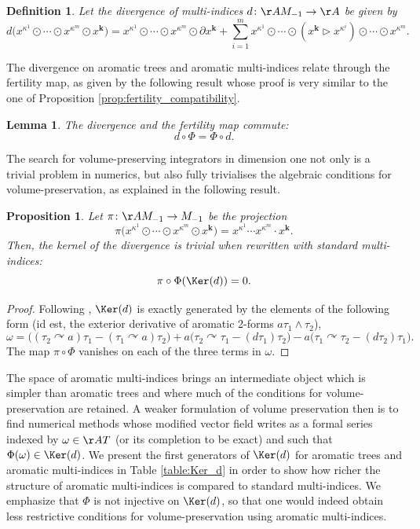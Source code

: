\documentclass[a4paper,11pt]{article}
\newtheorem{definition}[theorem]{Definition}
\newtheorem{proposition}[theorem]{Proposition}
\newtheorem{lemma}[theorem]{Lemma}
\begin{document}
\begin{definition}
Let the divergence of multi-indices $d\colon \AA M_{-1}\rightarrow \AA$ be given by
\[
d\big(x^{\kappa^1}\odot\cdots \odot x^{\kappa^m}\odot x^{\mathbf k}\big)
=x^{\kappa^1}\odot\cdots \odot x^{\kappa^m}\odot \partial x^{\mathbf k}
+\sum_{i=1}^m x^{\kappa^1}\odot\cdots \odot (x^{\mathbf k}\rhd x^{\kappa^i}) \odot\cdots \odot x^{\kappa^m}.
\]
\end{definition}

The divergence on aromatic trees and aromatic multi-indices relate through the fertility map, as given by the following result whose proof is very similar to the one of Proposition \ref{prop:fertility_compatibility}.
\begin{lemma}
The divergence and the fertility map commute:
\[d\circ \Phi=\Phi\circ d.\]
\end{lemma}


The search for volume-preserving integrators in dimension one not only is a trivial problem in numerics, but also fully trivialises the algebraic conditions for volume-preservation, as explained in the following result.
\begin{proposition}
Let $\pi\colon \AA M_{-1}\rightarrow M_{-1}$ be the projection
\[
\pi\big(x^{\kappa^1}\odot\cdots \odot x^{\kappa^m}\odot x^{\mathbf k}\big)
=x^{\kappa^1}\cdots x^{\kappa^m}\cdot x^{\mathbf k}.
\]
Then, the kernel of the divergence is trivial when rewritten with standard multi-indices:
\[\pi\circ \Phi(\Ker(d))=0.\]
\end{proposition}


\begin{proof}
Following \cite{Laurent23tab}, $\Ker(d)$ is exactly generated by the elements of the following form (id est, the exterior derivative of aromatic 2-forms $a\tau_1\wedge \tau_2$),
\[
\omega=\Big((\tau_2\curvearrowright a) \tau_1-(\tau_1\curvearrowright a) \tau_2\Big)
+a\Big(\tau_2\curvearrowright\tau_1-(d\tau_1)\tau_2\Big)
-a\Big(\tau_1\curvearrowright\tau_2-(d\tau_2)\tau_1\Big).
\]
The map $\pi\circ\Phi$ vanishes on each of the three terms in $\omega$.
\end{proof}


The space of aromatic multi-indices brings an intermediate object which is simpler than aromatic trees and where much of the conditions for volume-preservation are retained.
A weaker formulation of volume preservation then is to find numerical methods whose modified vector field writes as a formal series indexed by $\omega \in \AA T$ (or its completion to be exact) and such that $\Phi(\omega)\in\Ker(d)$.
We present the first generators of $\Ker(d)$ for aromatic trees and aromatic multi-indices in Table \ref{table:Ker_d} in order to show how richer the structure of aromatic multi-indices is compared to standard multi-indices.
We emphasize that $\Phi$ is not injective on $\Ker(d)$, so that one would indeed obtain less restrictive conditions for volume-preservation using aromatic multi-indices.
\end{document}

